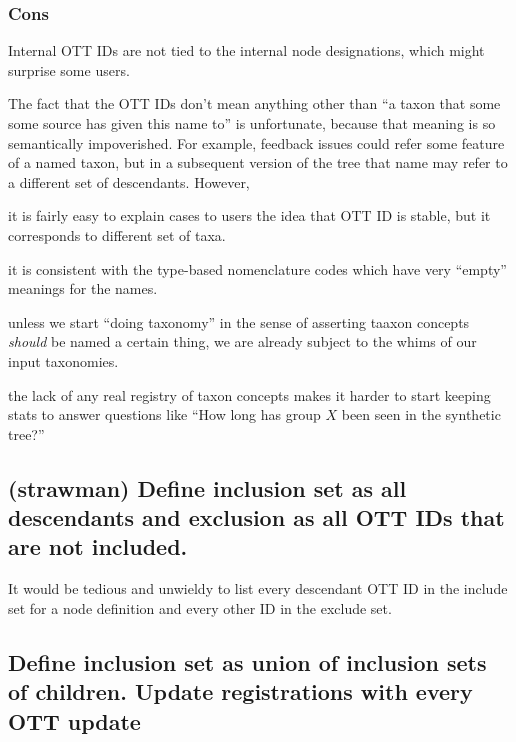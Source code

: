 \documentclass[11pt]{article}
\begin{document}
\subsubsection{Cons}
\begin{compactenum}
  \item Internal OTT IDs are not tied to the internal node designations, which might surprise
  some users.
  \item The fact that the OTT IDs don't mean anything other than ``a taxon that some
  some source has given this name to'' is unfortunate, because that meaning is so 
  semantically impoverished.
  For example, feedback issues could refer some feature of a named taxon, but in 
    a subsequent version of the tree that name may refer to a different set of 
    descendants.
  However,
  \begin{compactenum}
    \item it is fairly easy to explain cases to users the idea that OTT ID is stable,
    but it corresponds to different set of taxa.
    \item it is consistent with the type-based nomenclature codes which have
    very ``empty'' meanings for the names.
    \item unless we start ``doing taxonomy'' in the sense of asserting taaxon concepts
    {\em should} be named a certain thing, we are already subject to the whims
    of our input taxonomies.
  \end{compactenum}
  \item the lack of any real registry of taxon concepts makes it harder to
  start keeping stats to answer questions like ``How long has group $X$ been
  seen in the synthetic tree?''
\end{compactenum}

\subsection{(strawman) Define inclusion set as all descendants and exclusion as all 
OTT IDs that are not included.}
It would be tedious and unwieldy to list every descendant OTT ID in the include
  set for a node definition and every other ID in the exclude set.


\subsection{Define inclusion set as union of inclusion sets of children.
Update registrations with every OTT update}
\end{document}
